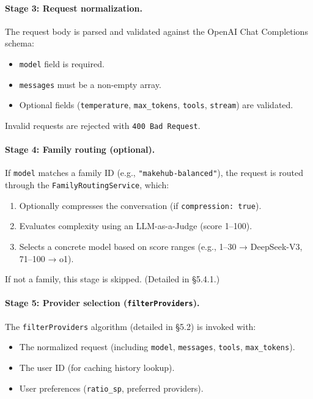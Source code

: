 \documentclass[english]{article}
\begin{document}
\paragraph{Stage 3: Request normalization.}

The request body is parsed and validated against the OpenAI Chat Completions schema:
\begin{itemize}
    \item \texttt{model} field is required.
    \item \texttt{messages} must be a non-empty array.
    \item Optional fields (\texttt{temperature}, \texttt{max\_tokens}, \texttt{tools}, \texttt{stream}) are validated.
\end{itemize}

Invalid requests are rejected with \texttt{400 Bad Request}.

\paragraph{Stage 4: Family routing (optional).}

If \texttt{model} matches a family ID (e.g., \texttt{"makehub-balanced"}), the request is routed through the \texttt{FamilyRoutingService}, which:
\begin{enumerate}
    \item Optionally compresses the conversation (if \texttt{compression: true}).
    \item Evaluates complexity using an LLM-as-a-Judge (score 1--100).
    \item Selects a concrete model based on score ranges (e.g., 1--30 → DeepSeek-V3, 71--100 → o1).
\end{enumerate}

If not a family, this stage is skipped. (Detailed in §5.4.1.)

\paragraph{Stage 5: Provider selection (\texttt{filterProviders}).}

The \texttt{filterProviders} algorithm (detailed in §5.2) is invoked with:
\begin{itemize}
    \item The normalized request (including \texttt{model}, \texttt{messages}, \texttt{tools}, \texttt{max\_tokens}).
    \item The user ID (for caching history lookup).
    \item User preferences (\texttt{ratio\_sp}, preferred providers).
\end{itemize}
\end{document}
